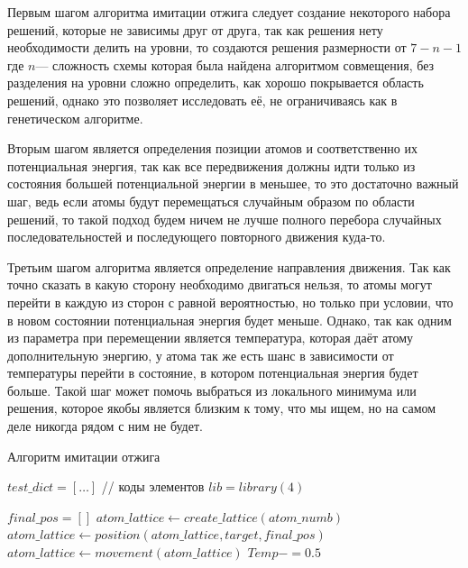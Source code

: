 \documentclass[14pt]{extarticle} %
\begin{document}
Первым шагом алгоритма имитации отжига следует создание некоторого набора решений, которые не зависимы друг от друга, так как решения нету необходимости делить на уровни, то создаются решения размерности от $7-n-1$ где $n$--- сложность схемы которая была найдена алгоритмом совмещения, без разделения на уровни сложно определить, как хорошо покрывается область решений, однако это позволяет исследовать её, не ограничиваясь как в генетическом алгоритме.\par
Вторым шагом является определения позиции атомов и соответственно их потенциальная энергия, так как все передвижения должны идти только из состояния большей потенциальной энергии в меньшее, то это достаточно важный шаг, ведь если атомы будут перемещаться случайным образом по области решений, то такой подход будем ничем не лучше полного перебора случайных последовательностей и последующего повторного движения куда-то.\par
Третьим шагом алгоритма является определение направления движения. Так как точно сказать в какую сторону необходимо двигаться нельзя, то атомы могут перейти в каждую из сторон с равной вероятностью, но только при условии, что в новом состоянии потенциальная энергия будет меньше. Однако, так как одним из параметра при перемещении является температура, которая даёт атому дополнительную энергию, у атома так же есть шанс в зависимости от температуры перейти в состояние, в котором потенциальная энергия будет больше. Такой шаг может помочь выбраться из локального минимума или решения, которое якобы является близким к тому, что мы ищем, но на самом деле никогда рядом с ним не будет.\par

  \begin{algorithm}[h]
	\caption{Алгоритм имитации отжига}\label{alg:Examples_ann}
	\begin{algorithmic}[1]
		
		\State $test\_dict=[\ldots]$ // коды элементов
		\State $lib=library(4)$
		
		\State $final\_pos=[]$
		\State $atom\_lattice\leftarrow create\_lattice(atom\_numb)$
		\State{}
		\State $atom\_lattice\leftarrow position(atom\_lattice,target,final\_pos)$
		\State $atom\_lattice\leftarrow movement(atom\_lattice)$
		\State $Temp-=0.5$
		\EndWhile
		
		
		\EndProcedure
	\end{algorithmic}
\end{algorithm}
\end{document}
